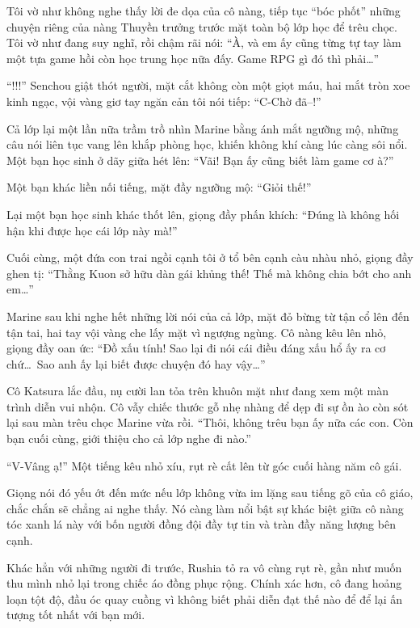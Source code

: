 \documentclass[../main.tex]{subfiles}
\begin{document}
Tôi vờ như không nghe thấy lời đe dọa của cô nàng, tiếp tục ``bóc phốt'' những chuyện riêng của nàng Thuyền trưởng trước mặt toàn bộ lớp học để trêu chọc. Tôi vờ như đang suy nghĩ, rồi chậm rãi nói: ``À, và em ấy cũng từng tự tay làm một tựa game hồi còn học trung học nữa đấy. Game RPG gì đó thì phải\dots''

``!!!'' Senchou giật thót người, mặt cắt không còn một giọt máu, hai mắt tròn xoe kinh ngạc, vội vàng giơ tay ngăn cản tôi nói tiếp: ``C-Chờ đã--!''

Cả lớp lại một lần nữa trầm trồ nhìn Marine bằng ánh mắt ngưỡng mộ, những câu nói liên tục vang lên khắp phòng học, khiến không khí càng lúc càng sôi nổi. Một bạn học sinh ở dãy giữa hét lên: ``Vãi! Bạn ấy cũng biết làm game cơ à?''

Một bạn khác liền nối tiếng, mặt đầy ngưỡng mộ: ``Giỏi thế!''

Lại một bạn học sinh khác thốt lên, giọng đầy phấn khích: ``Đúng là không hối hận khi được học cái lớp này mà!''

Cuối cùng, một đứa con trai ngồi cạnh tôi ở tổ bên cạnh càu nhàu nhỏ, giọng đầy ghen tị: ``Thằng Kuon sở hữu dàn gái khủng thế! Thế mà không chia bớt cho anh em\dots''

Marine sau khi nghe hết những lời nói của cả lớp, mặt đỏ bừng từ tận cổ lên đến tận tai, hai tay vội vàng che lấy mặt vì ngượng ngùng. Cô nàng kêu lên nhỏ, giọng đầy oan ức: ``Đồ xấu tính! Sao lại đi nói cái điều đáng xấu hổ ấy ra cơ chứ\dots\ Sao anh ấy lại biết được chuyện đó hay vậy\dots''

Cô Katsura lắc đầu, nụ cười lan tỏa trên khuôn mặt như đang xem một màn trình diễn vui nhộn. Cô vẫy chiếc thước gỗ nhẹ nhàng để dẹp đi sự ồn ào còn sót lại sau màn trêu chọc Marine vừa rồi. ``Thôi, không trêu bạn ấy nữa các con. Còn bạn cuối cùng, giới thiệu cho cả lớp nghe đi nào.''

``V-Vâng ạ!'' Một tiếng kêu nhỏ xíu, rụt rè cất lên từ góc cuối hàng năm cô gái.

Giọng nói đó yếu ớt đến mức nếu lớp không vừa im lặng sau tiếng gõ của cô giáo, chắc chắn sẽ chẳng ai nghe thấy. Nó càng làm nổi bật sự khác biệt giữa cô nàng tóc xanh lá này với bốn người đồng đội đầy tự tin và tràn đầy năng lượng bên cạnh.

Khác hẳn với những người đi trước, Rushia tỏ ra vô cùng rụt rè, gần như muốn thu mình nhỏ lại trong chiếc áo đồng phục rộng. Chính xác hơn, cô đang hoảng loạn tột độ, đầu óc quay cuồng vì không biết phải diễn đạt thế nào để để lại ấn tượng tốt nhất với bạn mới.
\end{document}
